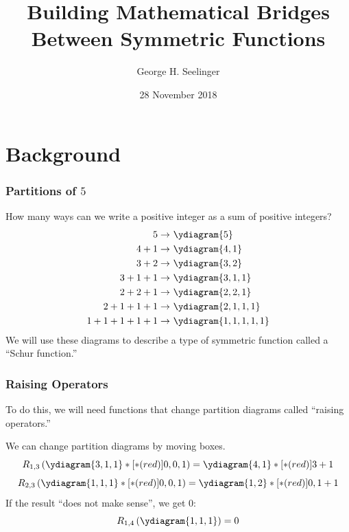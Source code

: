 \documentclass{beamer}
\title[Symmetric Functions]{Building Mathematical Bridges Between
  Symmetric Functions} %
\author[George H. Seelinger]{George H. Seelinger} %
\institute[JSF] %
{
Jefferson Scholars Foundation \\ %
\medskip
\textit{ghs9ae@virginia.edu} %
}
\date{28 November 2018} %
\begin{document}
\begin{frame}
\titlepage %
\end{frame}
\section{Background}
\begin{frame}
  \frametitle{Partitions of \(5\)}
  How many ways can we write a positive integer as a sum of positive
  integers? \pause
    \begin{align*}
    5 \to &\ \ydiagram{5}\\
    4+1 \to &\ \ydiagram{4,1}\\
    3+2 \to &\ \ydiagram{3,2}\\
    3+1+1 \to &\ \ydiagram{3,1,1}\\
    2+2+1 \to&\ \ydiagram{2,2,1}\\
    2+1+1+1 \to&\ \ydiagram{2,1,1,1} \\
    1+1+1+1+1 \to&\ \ydiagram{1,1,1,1,1}
    \end{align*}
  \pause We will use these diagrams to describe a type of symmetric
  function called a ``Schur function.''
\end{frame}
\begin{frame}
  \frametitle{Raising Operators}
  To do this, we will need functions that change partition diagrams
  called ``raising operators.'' \pause

  
  We can change partition diagrams by moving boxes.
  \[
    R_{1,3} \left( \ydiagram{3,1,1}*[*(red)]{0,0,1} \right) = \ydiagram{4,1}*[*(red)]{3+1}
  \]
\[
  R_{2,3} \left( \ydiagram{1,1,1}*[*(red)]{0,0,1} \right) = \ydiagram{1,2}*[*(red)]{0,1+1}
\]
\pause
If the result ``does not make sense'', we get \(0\): \[
  R_{1,4}\left( \ydiagram{1,1,1} \right) = 0
\]
\end{frame}
\end{document}

